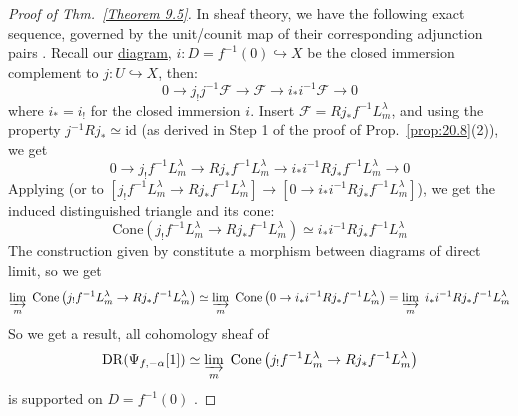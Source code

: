 \begin{proof}[Proof of Thm.~\ref{Theorem 9.5}]
    In sheaf theory, we have the following exact sequence, governed by the unit/counit map of their corresponding adjunction pairs \cite[23.4.G. and 2.7.B.]{VakilRisingSea2025}.
    Recall our \hyperref[commutative_diagram_of_hyper_surface]{diagram}, $i: D = f^{-1}(0) \hookrightarrow X$ be the closed immersion complement to $j: U \hookrightarrow X$, then:
    \[
        0\to j_! j^{-1} \mathcal{F} \to \mathcal{F} \to i_*i^{-1} \mathcal{F} \to 0
    \]
    where $i_* = i_!$ for the closed immersion $i$.
    Insert $\mathcal{F} = Rj_*f^{-1}L_m^{\lambda}$, and using the property $j^{-1} Rj_* \simeq \mathrm{id}$ (as derived in Step 1 of the proof of Prop.~\ref{prop:20.8}(2)), we get
    \[
        0\to j_! f^{-1}L_m^{\lambda} \to Rj_*f^{-1}L_m^{\lambda} \to i_*i^{-1} Rj_*f^{-1}L_m^{\lambda} \to 0
    \]
    Applying \cite[\href{https://stacks.math.columbia.edu/tag/08RI}{Tag 08RI}]{stacks-project} (or \cite[\href{https://stacks.math.columbia.edu/tag/014F}{Tag 014F}]{stacks-project} to $\left[j_! f^{-1}L_m^{\lambda} \to Rj_*f^{-1}L_m^{\lambda}\right] \to \left[0\to i_*i^{-1} Rj_*f^{-1}L_m^{\lambda}\right]$), we get the induced distinguished triangle and its cone:
    \[
        \mathrm{Cone}\left(j_! f^{-1}L_m^{\lambda} \rightarrow Rj_*f^{-1}L_m^{\lambda}\right) \simeq i_*i^{-1} Rj_*f^{-1}L_m^{\lambda}
    \]
    The construction given by \cite[\href{https://stacks.math.columbia.edu/tag/014F}{Tag 014F}]{stacks-project}
    constitute a morphism between diagrams of direct limit, so we get
    \[
        \varinjlim_m\ \mathrm{Cone}\left(j_! f^{-1} L_m^{\lambda} \rightarrow R j_* f^{-1} L_m^{\lambda}\right) \simeq \varinjlim_m\ \mathrm{Cone}\left(0 \to i_*i^{-1} Rj_*f^{-1}L_m^{\lambda}\right) = \varinjlim_m\ i_*i^{-1} Rj_*f^{-1}L_m^{\lambda}
    \]
    So we get a result, all cohomology sheaf of
    \[
        \mathrm{DR}(\Psi_{f,-\alpha}[1]) \simeq \varinjlim_m\ \mathrm{Cone}\left(j_! f^{-1} L_m^{\lambda} \rightarrow R j_* f^{-1} L_m^{\lambda}\right)
    \]
    is supported on $D = f^{-1}(0)$ \cite[\href{https://stacks.math.columbia.edu/tag/00AG}{Tag 00AG}]{stacks-project}.


\end{proof}
